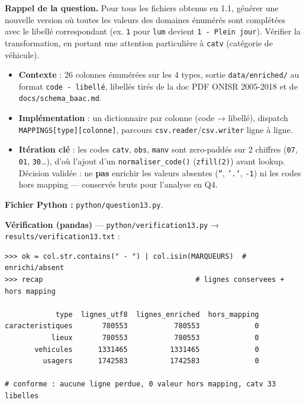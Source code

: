 \documentclass[11pt,a4paper]{article}
\newcommand{\rub}[2]{\textbf{\textcolor{#1}{#2}}}
\begin{document}
\rub{labrappel}{Rappel de la question.} Pour tous les fichiers obtenus en 1.1, générer une nouvelle version où toutes les valeurs des domaines énumérés sont complétées avec le libellé correspondant (ex. \texttt{1} pour \texttt{lum} devient \texttt{1 - Plein jour}). Vérifier la transformation, en portant une attention particulière à \texttt{catv} (catégorie de véhicule).

\begin{agentbox}
\begin{itemize}
\item \textbf{Contexte} : 26 colonnes énumérées sur les 4 types, sortie \texttt{data/enriched/} au format \texttt{code - libellé}, libellés tirés de la doc PDF ONISR 2005-2018 et de \texttt{docs/schema\_baac.md}.
\item \textbf{Implémentation} : un dictionnaire par colonne (code → libellé), dispatch \texttt{MAPPINGS[type][colonne]}, parcours \texttt{csv.reader}/\texttt{csv.writer} ligne à ligne.
\item \textbf{Itération clé} : les codes \texttt{catv}, \texttt{obs}, \texttt{manv} sont zero-paddés sur 2 chiffres (\texttt{07}, \texttt{01}, \texttt{30}…), d'où l'ajout d'un \texttt{normaliser\_code()} (\texttt{zfill(2)}) avant lookup. Décision validée : ne \textbf{pas} enrichir les valeurs absentes (\texttt{''}, \texttt{'.'}, \texttt{-1}) ni les codes hors mapping — conservés bruts pour l'analyse en Q4.
\end{itemize}
\end{agentbox}

\rub{labfichier}{Fichier Python :} \texttt{python/question13.py}.

\rub{labverif}{Vérification (pandas)} --- \texttt{python/verification13.py} → \texttt{results/verification13.txt} :

\begin{lstlisting}[style=pyblock]
>>> ok = col.str.contains(" - ") | col.isin(MARQUEURS)  # enrichi/absent
>>> recap                                    # lignes conservees + hors mapping

            type  lignes_utf8  lignes_enriched  hors_mapping
caracteristiques       780553           780553             0
           lieux       780553           780553             0
       vehicules      1331465          1331465             0
         usagers      1742583          1742583             0

# conforme : aucune ligne perdue, 0 valeur hors mapping, catv 33 libelles
\end{lstlisting}
\end{document}
